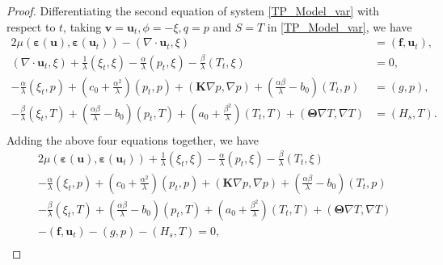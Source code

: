 \documentclass{article}
\numberwithin{equation}{section}
\begin{document}
\begin{proof}
 Differentiating the second equation of system \eqref{TP_Model_var} with respect to $t$, taking $\bm v= \bm u_t,\phi=-\xi,q=p$ and $S=T$ in \eqref{TP_Model_var}, we have
\begin{equation}\label{TP_Model_var_eq2dt}
\begin{aligned} 
2\mu(\bm\varepsilon(\bm u),\bm\varepsilon( \bm u_t)) - (\nabla\cdot \bm u_t,\xi)&=(\bm f, \bm u_t)       ,   \\
  (\nabla\cdot \bm u_t,\xi)+\frac{1}{\lambda}( \xi_t,\xi)-\frac{\alpha}{\lambda}( p_t,\xi)-\frac{\beta}{\lambda}( T_t,\xi)&=0 ,\\
 -\frac\alpha\lambda( \xi_t ,p)+(c_0+\frac{\alpha^2}{\lambda})( p_t ,p)+  (\bm K\nabla p,\nabla p)+ (\frac{\alpha\beta}{\lambda}-b_0)( T_t ,p)
                &=(g,p),\\
 -\frac\beta\lambda( \xi_t ,T)+(\frac{\alpha\beta}{\lambda}-b_0)( p_t ,T)+(a_0+\frac{\beta^2}{\lambda})( T_t ,T)   
  +(\bm\Theta\nabla T,\nabla T)&=( H_{s},T).\\
\end{aligned}
\end{equation}
Adding the above four equations together, we have
\begin{equation}\label{summation utxtptTt}
\begin{aligned} 
&2\mu(\bm\varepsilon(\bm u),\bm\varepsilon( \bm u_t))+\frac{1}{\lambda}( \xi_t,\xi)-\frac{\alpha}{\lambda}( p_t,\xi)-\frac{\beta}{\lambda}( T_t,\xi)\\
& -\frac\alpha\lambda( \xi_t ,p)+(c_0+\frac{\alpha^2}{\lambda})( p_t ,p)+(\bm K \nabla p,\nabla p)+ (\frac{\alpha\beta}{\lambda}-b_0)( T_t ,p)\\
& -\frac\beta\lambda( \xi_t ,T)+(\frac{\alpha\beta}{\lambda}-b_0)( p_t ,T)+(a_0+\frac{\beta^2}{\lambda})( T_t ,T)   
  +(\bm\Theta\nabla T,\nabla T)\\
& -(\bm f, \bm u_t) -(g,p) -( H_{s},T)=0,\\
\end{aligned}
\end{equation}


\end{proof}
\end{document}
